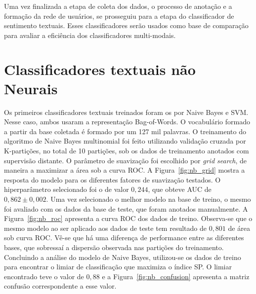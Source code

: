 Uma vez finalizada a etapa de coleta dos dados, o processo de anotação e a
formação da rede de usuários, se prosseguiu para a etapa do classificador de
sentimento textuais.
Esses classificadores serão usados como base de comparação para avaliar a
eficiência dos classificadores multi-modais.

\section{Classificadores textuais não Neurais}

Os primeiros classificadores textuais treinados foram os por Naive Bayes e SVM.
Nesse caso, ambos usaram a representação Bag-of-Words.
O vocabulário formado a partir da base coletada é formado por um 127 mil
palavras.
O treinamento do algoritmo de Naive Bayes multinomial foi feito utilizando
validação cruzada por K-partições, no total de 10 partições, sob os dados de
treinamento anotados com supervisão distante. O parâmetro de suavização foi
escolhido por \textit{grid search}, de maneira a maximizar a área sob a curva ROC.
A Figura~\ref{fig:nb_grid} mostra a resposta do modelo para os diferentes fatores
de suavização testados.
O hiperparâmetro selecionado foi o de valor $0,244$, que obteve AUC de $0,862 \pm 0,002$.
Uma vez selecionado o melhor modelo na base de treino, o mesmo foi avaliado com
os dados da base de teste, que foram anotados manualmente.
A Figura~\ref{fig:nb_roc} apresenta a curva ROC dos dados de treino.
Observa-se que o mesmo modelo ao ser aplicado aos dados de teste tem resultado
de $0,801$ de área sob curva ROC.
Vê-se que há uma diferença de performance entre as diferentes bases, que
sobressaí a dispersão observada nas partições do treinamento.
Concluindo a análise do modelo de Naive Bayes, utilizou-se os dados de treino
para encontrar o limiar de classificação que maximiza o índice SP.
O limiar encontrado teve o valor de $0,88$ e a Figura~\ref{fig:nb_confusion}
apresenta a matriz confusão correspondente a esse valor.

